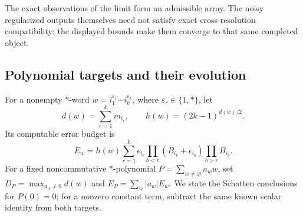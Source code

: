 \documentclass[11pt,a4paper]{amsart}
\numberwithin{equation}{section}
\theoremstyle{definition}
\theoremstyle{remark}
\begin{document}
The exact observations of the limit form an admissible array. The noisy regularized outputs themselves need not satisfy exact cross-resolution compatibility: the displayed bounds make them converge to that same completed object.

\subsection{Polynomial targets and their evolution}
For a nonempty $*$-word $w=i_1^{\varepsilon_1}\cdots i_k^{\varepsilon_k}$, where $\varepsilon_r\in\{1,*\}$, let
\[
 d(w)=\sum_{r=1}^km_{i_r},\qquad h(w)=(2k-1)^{d(w)/2}.
\]
Its computable error budget is
\begin{equation}\label{eq:wick_word_budget}
 E_w=h(w)\sum_{r=1}^k\epsilon_{i_r}
       \prod_{b<r}(B_{i_b}+\epsilon_{i_b})\prod_{b>r}B_{i_b}.
\end{equation}
For a fixed noncommutative $*$-polynomial $P=\sum_{w\ne\varnothing}a_ww$, set
$D_P=\max_{a_w\ne0}d(w)$ and $E_P=\sum_w|a_w|E_w$.
We state the Schatten conclusions for $P(0)=0$; for a nonzero constant term, subtract the same known scalar identity from both targets.
\end{document}
